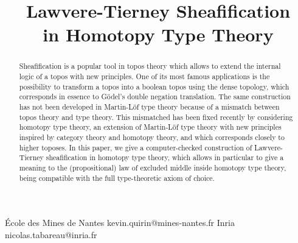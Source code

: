 \documentclass[preprint,9pt,numbers]{sigplanconf}
\begin{document}
\setlength{\pdfpageheight}{\paperheight}
\setlength{\pdfpagewidth}{\paperwidth}



\titlebanner{}        %
\preprintfooter{}   %

\title{Lawvere-Tierney Sheafification\\ in Homotopy Type Theory}

           {\'Ecole des Mines de Nantes}
           {kevin.quirin@mines-nantes.fr}
           {Inria}
           {nicolas.tabareau@inria.fr}

\maketitle

\begin{abstract}
  Sheafification is a popular tool in topos theory which
  allows to extend the internal logic of a topos with new
  principles. One of its most famous applications is the possibility
  to transform a topos into a boolean topos using the
  dense topology, which corresponds in essence to Gödel's double
  negation translation.
  The same construction has not been developed in Martin-Löf type
  theory because of a mismatch between topos theory and type theory. This
  mismatched has been fixed recently by considering homotopy type
  theory, an extension of Martin-Löf type theory with new
  principles inspired by category theory and homotopy theory, and
  which corresponds closely to higher toposes.
  In this paper, we give a computer-checked construction of
  Lawvere-Tierney sheafification in homotopy type theory, which allows
  in particular to give a meaning to the (propositional) law of
  excluded middle inside homotopy type theory, being
  compatible with the full type-theoretic axiom of choice.
\end{abstract}


\end{document}
